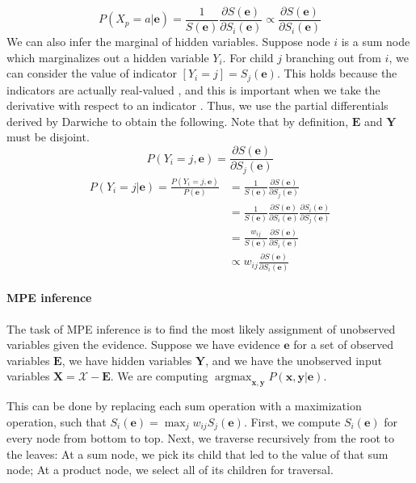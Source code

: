 \documentclass[10pt, titlepage]{article}
\theoremstyle{definition}
\newcommand\mb{\mathbf}
\DeclareMathOperator*{\argmax}{argmax}
\begin{document}
\begin{equation}
P(X_p=a|\mb{e})=\frac{1}{S(\mb{e})}\frac{\partial S(\mb{e})}{\partial S_i(\mb{e})}\propto\frac{\partial S(\mb{e})}{\partial S_i(\mb{e})}
\end{equation}
We can also infer the marginal of hidden variables. Suppose node $i$ is a sum node which marginalizes out a hidden variable $Y_i$. For child $j$ branching out from $i$, we can consider the value of indicator $[Y_i=j] = S_j(\mb{e})$. This holds because the indicators are actually real-valued \cite{darwiche2003differential}\cite{peharz2015theoretical}, and this is important when we take the derivative with respect to an indicator \cite{peharz2015theoretical}. Thus, we use the partial differentials derived by Darwiche \cite{darwiche2003differential} to obtain the following. Note that by definition, $\mb{E}$ and $\mb{Y}$ must be disjoint.
\begin{equation}\label{eq:pyi}
P(Y_i=j, \mb{e})=\frac{\partial S(\mb{e})}{\partial S_j(\mb{e})}
\end{equation}
\begin{equation}
  \begin{aligned}
    P(Y_i=j|\mb{e})= \frac{P(Y_i=j, \mb{e})}{P(\mb{e})} &= \frac{1}{S(\mb{e})}\frac{\partial S(\mb{e})}{\partial S_j(\mb{e})}\\
    &= \frac{1}{S(\mb{e})}\frac{\partial S(\mb{e})}{\partial S_i(\mb{e})}\frac{\partial S_i(\mb{e})}{\partial S_j(\mb{e})}\\
    &=\frac{w_{ij}}{S(\mb{e})}\frac{\partial S(\mb{e})}{\partial S_i(\mb{e})}\\
    &\propto w_{ij}\frac{\partial S(\mb{e})}{\partial S_i(\mb{e})}
  \end{aligned}
\end{equation}


\paragraph{MPE inference}\label{if:map}
The task of MPE inference is to find the most likely assignment of unobserved variables given the evidence. Suppose we have evidence $\mb{e}$ for a set of observed variables $\mb{E}$, we have hidden variables $\mb{Y}$, and we have the unobserved input variables $\mb{X}=\mathcal{X}-\mb{E}$. We are computing $\argmax_{\mb{x},\mb{y}}P(\mb{x},\mb{y}|\mb{e})$.


This can be done by replacing each sum operation with a maximization operation, such that $S_i(\mb{e})=\max_{j}w_{ij}S_j(\mb{e})$. First, we compute $S_i(\mb{e})$ for every node from bottom to top. Next, we traverse recursively from the root to the leaves: At a sum node, we pick its child that led to the value of that sum node; At a product node, we select all of its children for traversal. 
\end{document}
